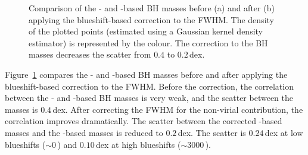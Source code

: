 \begin{figure}
    \captionsetup[subfigure]{labelformat=empty}  
    \centering 
    \subfloat[\label{fig:bhm_comparison_a}]{}
    \subfloat[\label{fig:bhm_comparison_b}]{}
    \caption[{Comparison of the - and \hans-based BH masses before and after applying the  blueshift-based correction to the  FWHM.}]{Comparison of the - and \hans-based BH masses before (a) and after (b) applying the  blueshift-based correction to the  FWHM. The density of the plotted points (estimated using a Gaussian kernel density estimator) is represented by the colour. The correction to the  BH masses decreases the scatter from $0.4$ to $0.2$\,dex.}   
    \label{fig:bhm_comparison}
\end{figure}

Figure~\ref{fig:bhm_comparison} compares the - and \hans-based BH masses before and after applying the blueshift-based correction to the  FWHM.
Before the correction, the correlation between the - and \hans-based BH masses is very weak, and the scatter between the masses is $0.4$\,dex. 
After correcting the  FWHM for the non-virial contribution, the correlation improves dramatically. 
The scatter between the corrected -based masses and the \hans-based masses is reduced to $0.2$\,dex. 
The scatter is $0.24$\,dex at low  blueshifts ($\sim0$\,\kms) and $0.10$\,dex at high blueshifts ($\sim3000$\,\kms). 

